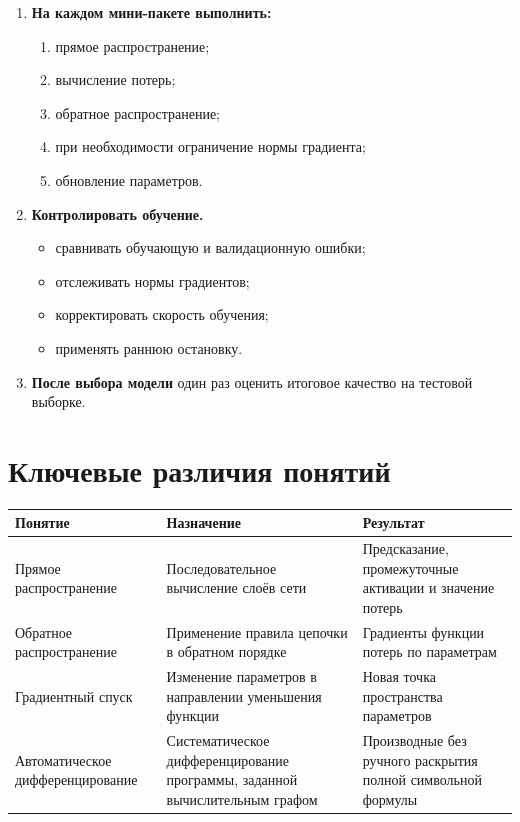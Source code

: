 \documentclass[12pt,a4paper]{article}
\theoremstyle{plain}
\theoremstyle{definition}
\theoremstyle{remark}
\begin{document}
\begin{enumerate}
    \item \textbf{На каждом мини-пакете выполнить:}
    \begin{enumerate}
        \item прямое распространение;
        \item вычисление потерь;
        \item обратное распространение;
        \item при необходимости ограничение нормы градиента;
        \item обновление параметров.
    \end{enumerate}

    \item \textbf{Контролировать обучение.}
    \begin{itemize}
        \item сравнивать обучающую и валидационную ошибки;
        \item отслеживать нормы градиентов;
        \item корректировать скорость обучения;
        \item применять раннюю остановку.
    \end{itemize}

    \item \textbf{После выбора модели} один раз оценить итоговое
    качество на тестовой выборке.
\end{enumerate}

\section{Ключевые различия понятий}

\begin{center}
\begin{tabularx}{\textwidth}{
    >{\raggedright\arraybackslash}p{}
    X
    X
}
\toprule
\textbf{Понятие} &
\textbf{Назначение} &
\textbf{Результат}\\
\midrule

Прямое распространение &
Последовательное вычисление слоёв сети &
Предсказание, промежуточные активации и значение потерь\\

Обратное распространение &
Применение правила цепочки в обратном порядке &
Градиенты функции потерь по параметрам\\

Градиентный спуск &
Изменение параметров в направлении уменьшения функции &
Новая точка пространства параметров\\

Автоматическое дифференцирование &
Систематическое дифференцирование программы, заданной
вычислительным графом &
Производные без ручного раскрытия полной символьной формулы\\
\bottomrule
\end{tabularx}
\end{center}
\end{document}
